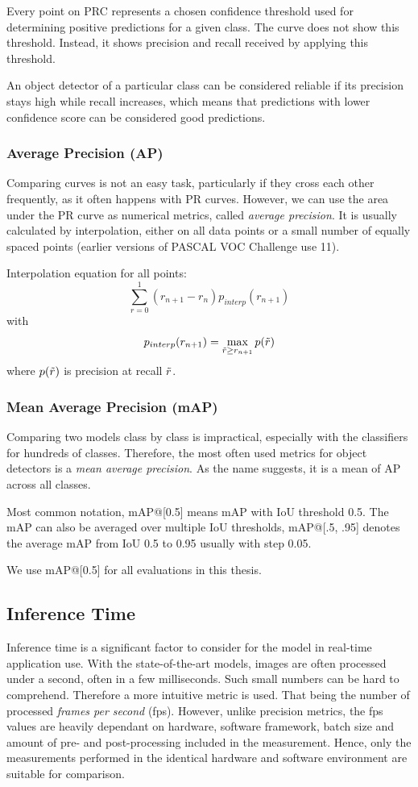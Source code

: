 Every point on PRC represents a chosen confidence threshold used for determining positive predictions for a given class. The curve does not show this threshold. Instead, it shows precision and recall received by applying this threshold.

An object detector of a particular class can be considered reliable if its precision stays high while recall increases, which means that predictions with lower confidence score can be considered good predictions.

\subsubsection{Average Precision (AP)}
Comparing curves is not an easy task, particularly if they cross each other frequently, as it often happens with PR curves. However, we can use the area under the PR curve as numerical metrics, called \textit{average precision}. It is usually calculated by interpolation, either on all data points or a small number of equally spaced points (earlier versions of PASCAL VOC Challenge use 11).

Interpolation equation for all points:
$$\sum_{r=0}^1 (r_{n+1} - r_n ) p_{interp}(r_{n+1})$$
with
$$p_{interp}(r_{n+1}) = \max_{\Tilde{r} \geq r_{n+1}} p(\Tilde{r})$$
where $p(\Tilde{r})$ is precision at recall $\Tilde{r}$.

\subsubsection{Mean Average Precision (mAP)}
Comparing two models class by class is impractical, especially with the classifiers for hundreds of classes. Therefore, the most often used metrics for object detectors is a \textit{mean average precision}. As the name suggests, it is a mean of AP across all classes.

Most common notation, mAP@[0.5] means mAP with IoU threshold 0.5. The mAP can also be averaged over multiple IoU thresholds, mAP@[.5, .95] denotes the average mAP from IoU 0.5 to 0.95 usually with step 0.05.

We use mAP@[0.5] for all evaluations in this thesis.

\subsection{Inference Time}
Inference time is a significant factor to consider for the model in real-time application use. With the state-of-the-art models, images are often processed under a second, often in a few milliseconds. Such small numbers can be hard to comprehend. Therefore a more intuitive metric is used. That being the number of processed \textit{frames per second} (fps). However, unlike precision metrics, the fps values are heavily dependant on hardware, software framework, batch size and amount of pre- and post-processing included in the measurement. Hence, only the measurements performed in the identical hardware and software environment are suitable for comparison.

